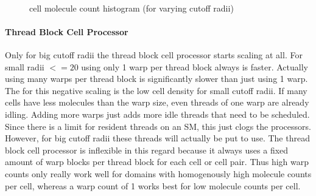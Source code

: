 \begin{figure}
\centering
{}
\\
\caption{cell molecule count histogram (for varying cutoff radii)}
\label{chart:molecule_count_histogram}
\end{figure}

\paragraph{Thread Block Cell Processor}
Only for big cutoff radii the thread block cell processor starts scaling at all. For small radii $<= 20$ using only 1 warp per thread block always is faster. Actually using many warps per thread block is significantly slower than just using 1 warp. The for this negative scaling is the low cell density  for small cutoff radii. If many cells have less molecules than the warp size, even threads of one warp are already idling. Adding more warps just adds more idle threads that need to be scheduled. Since there is a limit for resident threads on an SM, this just clogs the processors.
However, for big cutoff radii these threads will actually be put to use.
The thread block cell processor is inflexible in this regard because it always uses a fixed amount of warp blocks per thread block for each cell or cell pair. Thus high warp counts only really work well for domains with homogenously high molecule counts per cell, whereas a warp count of 1 works best for low molecule counts per cell.

